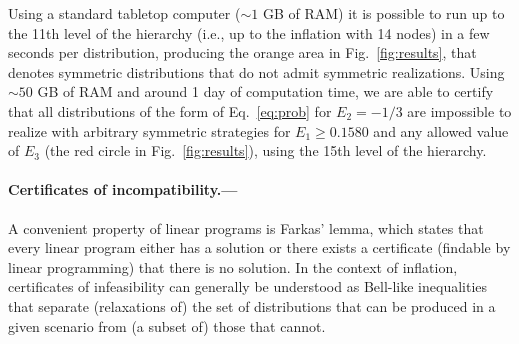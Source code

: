 \documentclass[aps,physrev,reprint,superscriptaddress,nofootinbib,twocolumn]{revtex4-2}
\begin{document}
Using a standard tabletop computer ($\sim1$ GB of RAM) it is possible to run up to the 11th level of the hierarchy (i.e., up to the inflation with 14 nodes) in a few seconds per distribution, producing the orange area in Fig.~\ref{fig:results}, that denotes symmetric distributions that do not admit symmetric realizations.
Using $\sim50$ GB of RAM and around 1 day of computation time, we are able to certify that all distributions of the form of Eq.~\eqref{eq:prob} for $E_2=-1/3$ are impossible to realize with arbitrary symmetric strategies for $E_1\geq0.1580$ and any allowed value of $E_3$ (the red circle in Fig.~\ref{fig:results}), using the 15th level of the hierarchy.

\paragraph*{Certificates of incompatibility.---}
A convenient property of linear programs is Farkas' lemma, which states that every linear program either has a solution or there exists a certificate (findable by linear programming) that there is no solution.
In the context of inflation, certificates of infeasibility can generally be understood as Bell-like inequalities \cite{bell1964} that separate (relaxations of) the set of distributions that can be produced in a given scenario from (a subset of) those that cannot.
\end{document}
